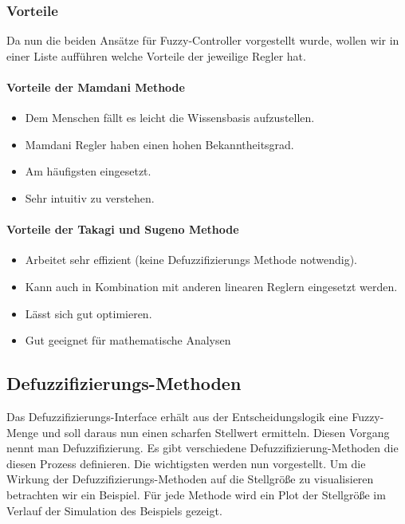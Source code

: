 \documentclass[12pt,a4paper,bibliography=totocnumbered,listof=totocnumbered, abstracton]{scrartcl}
\theoremstyle{Umgebung}
\begin{document}
\subsubsection{Vorteile}

Da nun die beiden Ansätze für Fuzzy-Controller vorgestellt wurde, wollen wir in einer Liste aufführen welche Vorteile der jeweilige Regler hat.

\paragraph{Vorteile der Mamdani Methode}

\begin{itemize}
	\item Dem Menschen fällt es leicht die Wissensbasis aufzustellen.
	\item Mamdani Regler haben einen hohen Bekanntheitsgrad.
	\item Am häufigsten eingesetzt.
	\item Sehr intuitiv zu verstehen.
\end{itemize}

\paragraph{Vorteile der Takagi und Sugeno Methode}

\begin{itemize}
	\item Arbeitet sehr effizient (keine Defuzzifizierungs Methode notwendig).
	\item Kann auch in Kombination mit anderen linearen Reglern eingesetzt werden.
	\item Lässt sich gut optimieren.
	\item Gut geeignet für mathematische Analysen
\end{itemize}

\label{defuzzy}
\subsection{Defuzzifizierungs-Methoden}

Das Defuzzifizierungs-Interface erhält aus der Entscheidungslogik eine Fuzzy-Menge und soll daraus nun einen scharfen Stellwert ermitteln. Diesen Vorgang nennt man Defuzzifizierung. Es gibt verschiedene Defuzzifizierung-Methoden die diesen Prozess definieren. Die wichtigsten werden nun vorgestellt. Um die Wirkung der Defuzzifizierungs-Methoden auf die Stellgröße zu visualisieren betrachten wir ein Beispiel. Für jede Methode wird  ein Plot der Stellgröße im Verlauf der Simulation des Beispiels gezeigt.
\end{document}
